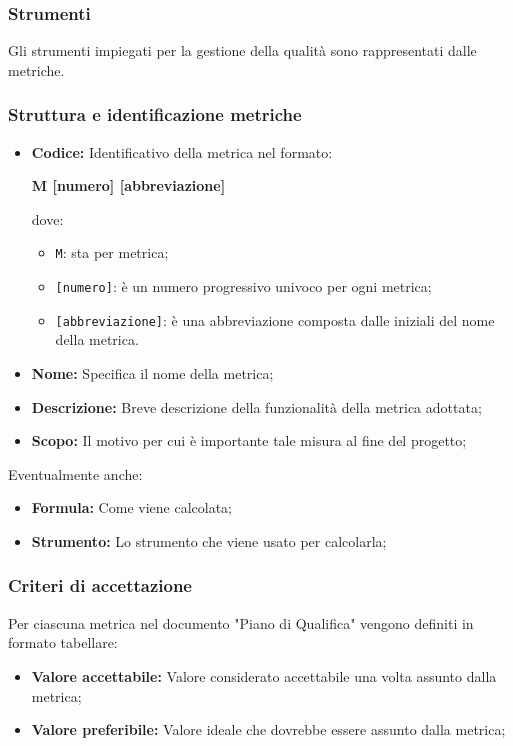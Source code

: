\subsubsection{Strumenti}
Gli strumenti impiegati per la gestione della qualità sono rappresentati dalle metriche.

\subsubsection{Struttura e identificazione metriche}
\begin{itemize}
    \item \textbf{Codice:} Identificativo della metrica nel formato:
        \begin{center}
            \textbf{M [numero] [abbreviazione]}
        \end{center}
        dove:
        \begin{itemize}
            \item \texttt{M}: sta per metrica;
            \item \texttt{[numero]}: è un numero progressivo univoco per ogni metrica;
            \item \texttt{[abbreviazione]}: è una abbreviazione composta dalle iniziali del nome della metrica.
        \end{itemize}
    \item \textbf{Nome:} Specifica il nome della metrica;
    \item \textbf{Descrizione:} Breve descrizione della funzionalità della metrica adottata;
    \item \textbf{Scopo:}
        Il motivo per cui è importante tale misura al fine del progetto;

\end{itemize}
    \vspace{0.2cm}
    Eventualmente anche:
\begin{itemize}
    \item \textbf{Formula:} Come viene calcolata;
    \item \textbf{Strumento:} Lo strumento che viene usato per calcolarla;
\end{itemize}

\subsubsection{Criteri di accettazione}
Per ciascuna metrica nel documento "Piano di Qualifica" vengono definiti in formato tabellare:
\begin{itemize}
    \item \textbf{Valore accettabile:}
        Valore considerato accettabile una volta assunto dalla metrica;
    \item \textbf{Valore preferibile:}
        Valore ideale che dovrebbe essere assunto dalla metrica;
\end{itemize}

